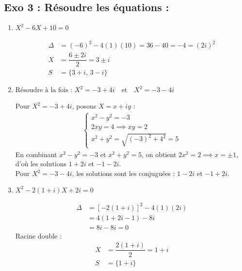 \documentclass[13pt]{extarticle}
\begin{document}
\subsection{Exo 3 :  Résoudre les équations :}

\begin{enumerate}
\def\labelenumi{\arabic{enumi}.}
\item \(X^2 - 6X + 10 = 0\)
\begin{framed}
\begin{align*}
\Delta &= (-6)^2 - 4(1)(10) = 36 - 40 = -4 = (2i)^2 \\
X &= \dfrac{6 \pm 2i}{2} = 3 \pm i \\
S &= \{3+i, \, 3-i\}
\end{align*}
\end{framed}

\item \(\text{Résoudre à la fois : } X^2 = -3 + 4i \quad \text{et}
	\quad X^2 = -3 - 4i \)
\begin{framed}
Pour $X^2 = -3+4i$, posons $X = x+iy$ :
\begin{align*}
\begin{cases}
x^2 - y^2 = -3 \\
2xy = 4 \implies xy = 2 \\
x^2 + y^2 = \sqrt{(-3)^2 + 4^2} = 5
\end{cases}
\end{align*}
En combinant $x^2-y^2=-3$ et $x^2+y^2=5$, on obtient $2x^2 = 2 \implies x = \pm 1$, d'où les solutions $1+2i$ et $-1-2i$. \\
Pour $X^2 = -3-4i$, les solutions sont les conjuguées : $1-2i$ et $-1+2i$.
\end{framed}

\item $X^2 - 2(1+i)X + 2i = 0 $
\begin{framed}
\begin{align*}
\Delta &= [-2(1+i)]^2 - 4(1)(2i) \\
&= 4(1 + 2i - 1) - 8i \\
&= 8i - 8i = 0
\end{align*}
Racine double :
\begin{align*}
X &= \dfrac{2(1+i)}{2} = 1+i \\
S &= \{1+i\}
\end{align*}
\end{framed}

\end{enumerate}
\end{document}
